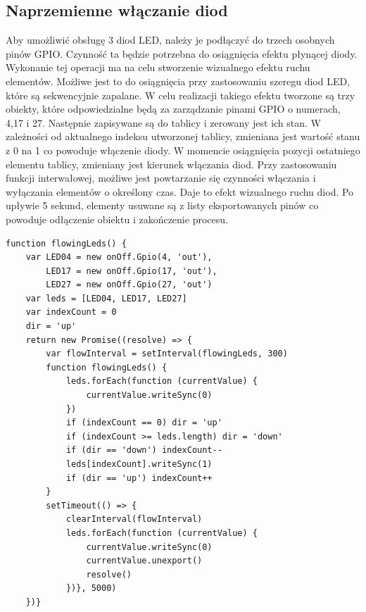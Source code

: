 \subsection{Naprzemienne włączanie diod}
Aby umożliwić obsługę 3 diod LED, należy je podłączyć do trzech osobnych pinów GPIO. Czynność ta będzie potrzebna do osiągnięcia efektu płynącej diody. Wykonanie tej operacji ma na celu stworzenie wizualnego efektu ruchu elementów. Możliwe jest to do osiągnięcia przy zastosowaniu szeregu diod LED, które są sekwencyjnie zapalane. W celu realizacji takiego efektu tworzone są trzy obiekty, które odpowiedzialne będą za zarządzanie pinami GPIO o numerach, 4,17 i 27. Następnie zapisywane są do tablicy i zerowany jest ich stan. W zależności od aktualnego indeksu utworzonej tablicy, zmieniana jest wartość stanu z 0 na 1 co powoduje włączenie diody. W momencie osiągnięcia pozycji ostatniego elementu tablicy, zmieniany jest kierunek włączania diod. Przy zastosowaniu funkcji interwałowej, możliwe jest powtarzanie się czynności włączania i wyłączania elementów o określony czas. Daje to efekt wizualnego ruchu diod. Po upływie 5 sekund, elementy usuwane są z listy eksportowanych pinów co powoduje odłączenie obiektu i zakończenie procesu.
\newpage
\begin{lstlisting}[caption=Implementacja funkcji tworzącej efekt płynącej diody]
function flowingLeds() {
    var LED04 = new onOff.Gpio(4, 'out'),
        LED17 = new onOff.Gpio(17, 'out'),
        LED27 = new onOff.Gpio(27, 'out')
    var leds = [LED04, LED17, LED27]
    var indexCount = 0
    dir = 'up'
    return new Promise((resolve) => {
        var flowInterval = setInterval(flowingLeds, 300)
        function flowingLeds() {
            leds.forEach(function (currentValue) {
                currentValue.writeSync(0)
            })
            if (indexCount == 0) dir = 'up'
            if (indexCount >= leds.length) dir = 'down'
            if (dir == 'down') indexCount--
            leds[indexCount].writeSync(1)
            if (dir == 'up') indexCount++
        }
        setTimeout(() => {
            clearInterval(flowInterval)
            leds.forEach(function (currentValue) {
                currentValue.writeSync(0)
                currentValue.unexport()
                resolve()
            })}, 5000)
    })}
\end{lstlisting}

